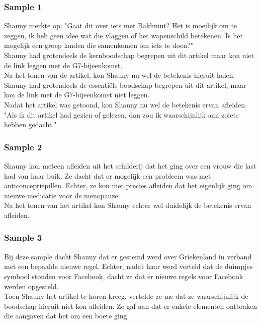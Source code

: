 \subsubsection{Sample 1}
Shauny merkte op: "Gaat dit over iets met Bakhmut? Het is moeilijk om te zeggen, ik heb geen idee wat die vlaggen of het wapenschild betekenen. Is het mogelijk een groep landen die samenkomen om iets te doen?" \\

Shauny had grotendeels de kernboodschap begrepen uit dit artikel maar kon niet de link leggen met de G7-bijeenkomst.  \\

Na het tonen van de artikel, kon Shauny nu wel de betekenis hieruit halen. 
Shauny had grotendeels de essentiële boodschap begrepen uit dit artikel, maar kon de link met de G7-bijeenkomst niet leggen. \\

Nadat het artikel was getoond, kon Shauny nu wel de betekenis ervan afleiden.
"Als ik dit artikel had gezien of gelezen, dan zou ik waarschijnlijk aan zoiets hebben gedacht."

\subsubsection{Sample 2}
Shauny kon meteen afleiden uit het schilderij dat het ging over een vrouw die last had van haar buik. Ze dacht dat er mogelijk een probleem was met anticonceptiepillen. Echter, ze kon niet precies afleiden dat het eigenlijk ging om nieuwe medicatie voor de menopauze.\\

Na het tonen van het artikel kon Shauny echter wel duidelijk de betekenis ervan afleiden.

\subsubsection{Sample 3}
Bij deze sample dacht Shauny dat er gestemd werd over Griekenland in verband met een bepaalde nieuwe regel. Echter, nadat haar werd verteld dat de duimpjes symbool stonden voor Facebook, dacht ze dat er nieuwe regels voor Facebook werden opgesteld. \\

Toen Shauny het artikel te horen kreeg, vertelde ze me dat ze waarschijnlijk de boodschap hieruit niet kon afleiden. Ze gaf aan dat er enkele elementen ontbraken die aangaven dat het om een boete ging.

